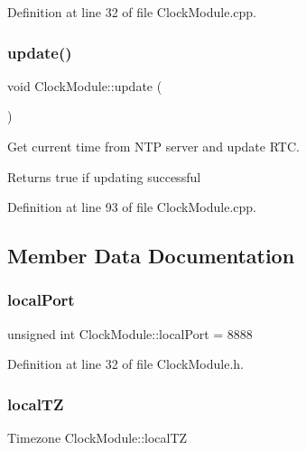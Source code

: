 Definition at line 32 of file Clock\+Module.\+cpp.

\mbox{\label{class_clock_module_afbc823bb09d912dbdc25f9d38ec78624}} 
\subsubsection{\texorpdfstring{update()}{update()}}
{\footnotesize\ttfamily void Clock\+Module\+::update (\begin{DoxyParamCaption}{ }\end{DoxyParamCaption})}



Get current time from N\+TP server and update R\+TC. 

\begin{DoxyReturn}{Returns}
true if updating successful 
\end{DoxyReturn}


Definition at line 93 of file Clock\+Module.\+cpp.



\subsection{Member Data Documentation}
\mbox{\label{class_clock_module_a0ea28a7086d25b525ae2ae7e8ac05004}} 
\subsubsection{\texorpdfstring{localPort}{localPort}}
{\footnotesize\ttfamily unsigned int Clock\+Module\+::local\+Port = 8888\hspace{0.3cm}{\ttfamily [private]}}



Definition at line 32 of file Clock\+Module.\+h.

\mbox{\label{class_clock_module_a6fc4d5d14eec707268959c3e482dae3e}} 
\subsubsection{\texorpdfstring{localTZ}{localTZ}}
{\footnotesize\ttfamily Timezone Clock\+Module\+::local\+TZ\hspace{0.3cm}{\ttfamily [private]}}



